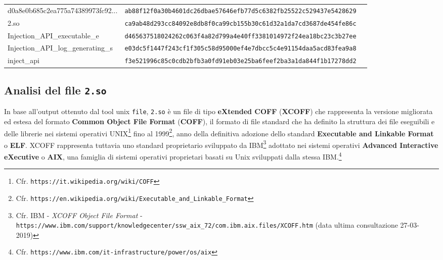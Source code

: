 \documentclass[10pt,a4paper, titlepage]{report}
\begin{document}
\begin{table}[h!]
\begin{center}
\begin{adjustbox}{width=1.5\textwidth,center=\textwidth}
\begin{tabular}{l|c|r}
      d0a8e0b685c2ea775a74389973fc92... & \texttt{ab88f12f0a30b4601dc26dbae57646efb77d5c6382fb25522c529437e5428629} \\
      
      2.so & \texttt{ca9ab48d293cc84092e8db8f0ca99cb155b30c61d32a1da7cd3687de454fe86c} \\
      
      Injection\_API\_executable\_e & \texttt{d465637518024262c063f4a82d799a4e40ff3381014972f24ea18bc23c3b27ee}\\
      
      Injection\_API\_log\_generating\_s & \texttt{e03dc5f1447f243cf1f305c58d95000ef4e7dbcc5c4e91154daa5acd83fea9a8}\\
      
      inject\_api & \texttt{f3e521996c85c0cdb2bfb3a0fd91eb03e25ba6feef2ba3a1da844f1b17278dd2}\\
      
      \bottomrule
    \end{tabular}
    \end{adjustbox}
  \end{center}
\end{table}






















\newpage
\subsection{Analisi del file \texttt{2.so}}

In base all'output ottenuto dal tool unix \texttt{file}, \texttt{2.so} è un file di tipo \textbf{eXtended COFF} (\textbf{XCOFF}) che rappresenta la versione migliorata ed estesa del formato \textbf{Common Object File Format} (\textbf{COFF}), il formato di file standard che ha definito la struttura dei file eseguibili e delle librerie nei sistemi operativi UNIX\footnote{Cfr. \texttt{https://it.wikipedia.org/wiki/COFF}} fino al 1999\footnote{Cfr. \texttt{https://en.wikipedia.org/wiki/Executable\_and\_Linkable\_Format}}, anno della definitiva adozione dello standard \textbf{Executable and Linkable Format} o \textbf{ELF}.
XCOFF rappresenta tuttavia uno standard proprietario sviluppato da IBM\footnote{Cfr. IBM - \textit{XCOFF Object File Format} - \texttt{https://www.ibm.com/support/knowledgecenter/ssw\_aix\_72/com.ibm.aix.files/XCOFF.htm} (data ultima consultazione 27-03-2019)} adottato nei sistemi operativi \textbf{Advanced Interactive eXecutive} o \textbf{AIX}, una famiglia di sistemi operativi proprietari basati su Unix sviluppati dalla stessa IBM.\footnote{Cfr. \texttt{https://www.ibm.com/it-infrastructure/power/os/aix}}
\end{document}
